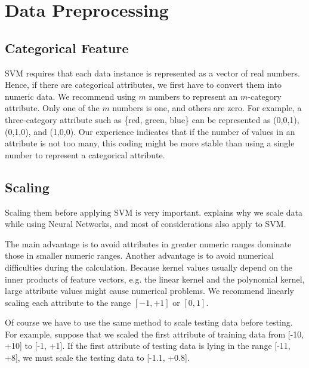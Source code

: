\documentclass[12pt]{article}
\begin{document}

\section{Data Preprocessing}

\subsection{Categorical Feature}

SVM requires that each data instance is represented
as a vector of real numbers. Hence, if there are 
categorical attributes, we first have to convert 
them into numeric data. We recommend using $m$ numbers to 
represent an $m$-category attribute. Only one of the $m$
numbers is one, and others are zero. For example,
a three-category attribute such as \{red, green, blue\}
can be represented as (0,0,1),
(0,1,0), and (1,0,0). Our experience indicates that if
the number of values in an attribute is not too many, 
this coding might be more stable 
than using a single number to represent a 
categorical attribute. 

\subsection{Scaling}
\label{scaling}

Scaling them before applying SVM is very important.
\href{ftp://ftp.sas.com/pub/neural/FAQ.html}
{\cite[Part 2 of Neural Networks FAQ]{NN01a}} explains why we scale 
data while using Neural Networks, and most 
of considerations also apply to SVM. 

The main advantage is to avoid attributes in 
greater numeric ranges dominate those in 
smaller numeric ranges. Another advantage is to 
avoid numerical difficulties during the calculation. 
Because kernel values usually depend on the
inner products of feature vectors, e.g. the linear
kernel and the polynomial kernel, large attribute
values might cause numerical problems.
We recommend linearly scaling each attribute to 
the range $[-1,+1]$ or $[0,1]$.

Of course we have to use the same method to 
scale testing data before testing. For example, 
suppose that we scaled the first attribute 
of training data from [-10, +10] to [-1, +1]. 
If the first attribute of testing
data is lying in the range [-11, +8], we must 
scale the testing data to [-1.1, +0.8].
\end{document}
